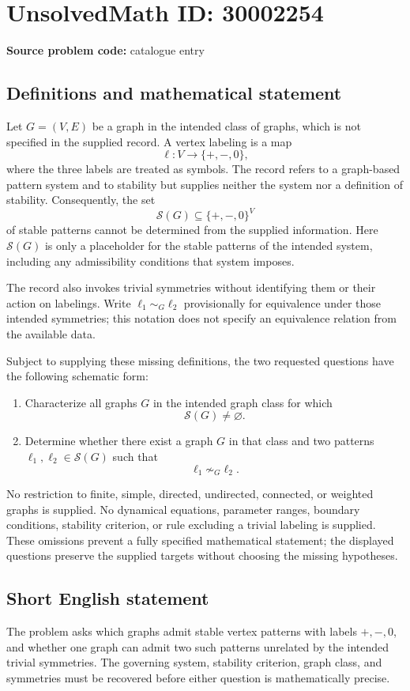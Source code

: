 \documentclass[11pt]{article}
\begin{document}
\section*{UnsolvedMath ID: 30002254}
\textbf{Source problem code:} catalogue entry
\subsection{Definitions and mathematical statement}
Let \(G=(V,E)\) be a graph in the intended class of graphs, which is not specified in the supplied record. A vertex labeling is a map
\[
\ell:V\longrightarrow\{+,-,0\},
\]
where the three labels are treated as symbols. The record refers to a graph-based pattern system and to stability but supplies neither the system nor a definition of stability. Consequently, the set
\[
\mathcal S(G)\subseteq\{+,-,0\}^{V}
\]
of stable patterns cannot be determined from the supplied information. Here \(\mathcal S(G)\) is only a placeholder for the stable patterns of the intended system, including any admissibility conditions that system imposes.

The record also invokes trivial symmetries without identifying them or their action on labelings. Write \(\ell_1\sim_G\ell_2\) provisionally for equivalence under those intended symmetries; this notation does not specify an equivalence relation from the available data.

Subject to supplying these missing definitions, the two requested questions have the following schematic form:
\begin{enumerate}
\item Characterize all graphs \(G\) in the intended graph class for which
\[
\mathcal S(G)\ne\varnothing.
\]
\item Determine whether there exist a graph \(G\) in that class and two patterns \(\ell_1,\ell_2\in\mathcal S(G)\) such that
\[
\ell_1\not\sim_G\ell_2.
\]
\end{enumerate}
No restriction to finite, simple, directed, undirected, connected, or weighted graphs is supplied. No dynamical equations, parameter ranges, boundary conditions, stability criterion, or rule excluding a trivial labeling is supplied. These omissions prevent a fully specified mathematical statement; the displayed questions preserve the supplied targets without choosing the missing hypotheses.
\subsection{Short English statement}
The problem asks which graphs admit stable vertex patterns with labels \(+, -, 0\), and whether one graph can admit two such patterns unrelated by the intended trivial symmetries. The governing system, stability criterion, graph class, and symmetries must be recovered before either question is mathematically precise.
\end{document}
